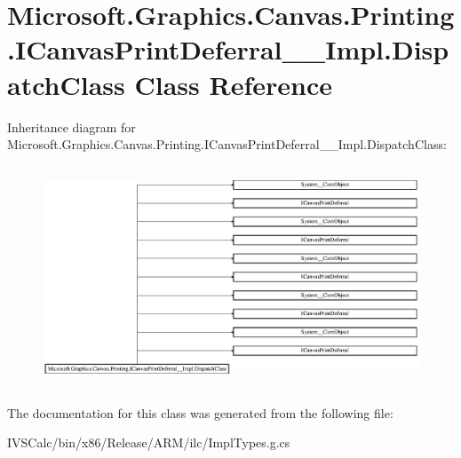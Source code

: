 \hypertarget{class_microsoft_1_1_graphics_1_1_canvas_1_1_printing_1_1_i_canvas_print_deferral_____impl_1_1_dispatch_class}{}\section{Microsoft.\+Graphics.\+Canvas.\+Printing.\+I\+Canvas\+Print\+Deferral\+\_\+\+\_\+\+Impl.\+Dispatch\+Class Class Reference}
\label{class_microsoft_1_1_graphics_1_1_canvas_1_1_printing_1_1_i_canvas_print_deferral_____impl_1_1_dispatch_class}
Inheritance diagram for Microsoft.\+Graphics.\+Canvas.\+Printing.\+I\+Canvas\+Print\+Deferral\+\_\+\+\_\+\+Impl.\+Dispatch\+Class\+:\begin{figure}[H]
\begin{center}
\leavevmode
\includegraphics[height=6.623656cm]{class_microsoft_1_1_graphics_1_1_canvas_1_1_printing_1_1_i_canvas_print_deferral_____impl_1_1_dispatch_class}
\end{center}
\end{figure}


The documentation for this class was generated from the following file\+:\begin{DoxyCompactItemize}
\item 
I\+V\+S\+Calc/bin/x86/\+Release/\+A\+R\+M/ilc/Impl\+Types.\+g.\+cs\end{DoxyCompactItemize}
